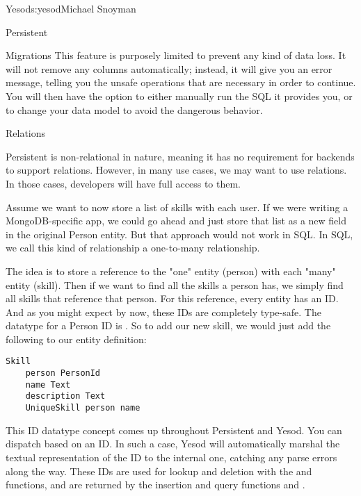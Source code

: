 \begin{aosachapter}{Yesod}{s:yesod}{Michael Snoyman}
\begin{aosasect1}{Persistent}
\begin{aosasect2}{Migrations}
This feature is purposely limited to prevent any kind of data loss. It
will not remove any columns automatically; instead, it will give you
an error message, telling you the unsafe operations that are necessary
in order to continue. You will then have the option to either manually
run the SQL it provides you, or to change your data model to avoid the
dangerous behavior.

\end{aosasect2}

\begin{aosasect2}{Relations}

Persistent is non-relational in nature, meaning it has no requirement
for backends to support relations. However, in many use cases, we may
want to use relations. In those cases, developers will have full
access to them.

Assume we want to now store a list of skills with each user. If we
were writing a MongoDB-specific app, we could go ahead and just store
that list as a new field in the original Person entity. But that
approach would not work in SQL. In SQL, we call this kind of
relationship a one-to-many relationship.

The idea is to store a reference to the "one" entity (person) with
each "many" entity (skill). Then if we want to find all the skills a
person has, we simply find all skills that reference that person. For
this reference, every entity has an ID. And as you might expect by
now, these IDs are completely type-safe. The datatype for a Person ID
is . So to add our new skill, we would just add the
following to our entity definition:

\begin{verbatim}
Skill
    person PersonId
    name Text
    description Text
    UniqueSkill person name
\end{verbatim}

This ID datatype concept comes up throughout Persistent and Yesod. You
can dispatch based on an ID. In such a case, Yesod will automatically
marshal the textual representation of the ID to the internal one,
catching any parse errors along the way. These IDs are used for lookup
and deletion with the  and  functions, and are
returned by the insertion and query functions  and
.

\end{aosasect2}

\end{aosasect1}


\end{aosachapter}
